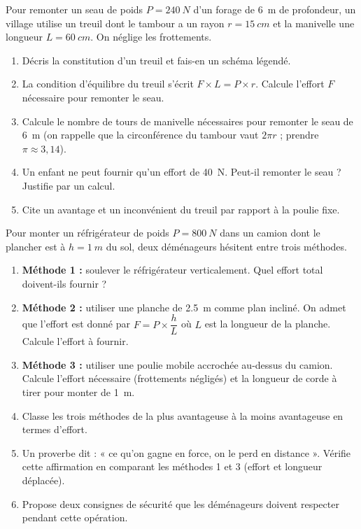 \documentclass[11pt]{article}
\begin{document}
\begin{exercice}
Pour remonter un seau de poids $P = \SI{240}{N}$ d'un forage de \SI{6}{m} de profondeur, un village utilise un treuil dont le tambour a un rayon $r = \SI{15}{cm}$ et la manivelle une longueur $L = \SI{60}{cm}$. On néglige les frottements.
\begin{enumerate}
\item Décris la constitution d'un treuil et fais-en un schéma légendé.
\item La condition d'équilibre du treuil s'écrit $F \times L = P \times r$. Calcule l'effort $F$ nécessaire pour remonter le seau.
\item Calcule le nombre de tours de manivelle nécessaires pour remonter le seau de \SI{6}{m} (on rappelle que la circonférence du tambour vaut $2\pi r$ ; prendre $\pi \approx 3,14$).
\item Un enfant ne peut fournir qu'un effort de \SI{40}{N}. Peut-il remonter le seau ? Justifie par un calcul.
\item Cite un avantage et un inconvénient du treuil par rapport à la poulie fixe.
\end{enumerate}
\end{exercice}

\begin{exercice}
Pour monter un réfrigérateur de poids $P = \SI{800}{N}$ dans un camion dont le plancher est à $h = \SI{1}{m}$ du sol, deux déménageurs hésitent entre trois méthodes.
\begin{enumerate}
\item \textbf{Méthode 1 :} soulever le réfrigérateur verticalement. Quel effort total doivent-ils fournir ?
\item \textbf{Méthode 2 :} utiliser une planche de \SI{2,5}{m} comme plan incliné. On admet que l'effort est donné par $F = P \times \dfrac{h}{L}$ où $L$ est la longueur de la planche. Calcule l'effort à fournir.
\item \textbf{Méthode 3 :} utiliser une poulie mobile accrochée au-dessus du camion. Calcule l'effort nécessaire (frottements négligés) et la longueur de corde à tirer pour monter de \SI{1}{m}.
\item Classe les trois méthodes de la plus avantageuse à la moins avantageuse en termes d'effort.
\item Un proverbe dit : « ce qu'on gagne en force, on le perd en distance ». Vérifie cette affirmation en comparant les méthodes 1 et 3 (effort et longueur déplacée).
\item Propose deux consignes de sécurité que les déménageurs doivent respecter pendant cette opération.
\end{enumerate}
\end{exercice}
\end{document}
